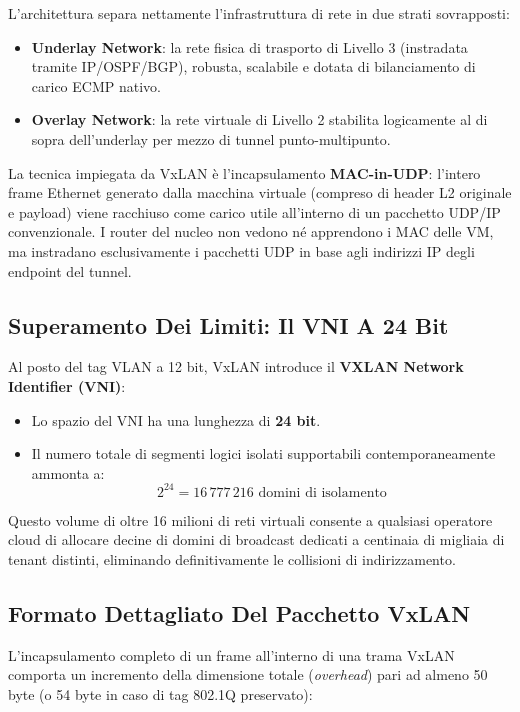 \documentclass[11pt, a4paper]{article}
\begin{document}
L'architettura separa nettamente l'infrastruttura di rete in due strati sovrapposti:
\begin{itemize}[noitemsep]
    \item \textbf{Underlay Network}: la rete fisica di trasporto di Livello 3 (instradata tramite IP/OSPF/BGP), robusta, scalabile e dotata di bilanciamento di carico ECMP nativo.
    \item \textbf{Overlay Network}: la rete virtuale di Livello 2 stabilita logicamente al di sopra dell'underlay per mezzo di tunnel punto-multipunto.
\end{itemize}


La tecnica impiegata da VxLAN è l'incapsulamento \textbf{MAC-in-UDP}: l'intero frame Ethernet generato dalla macchina virtuale (compreso di header L2 originale e payload) viene racchiuso come carico utile all'interno di un pacchetto UDP/IP convenzionale. I router del nucleo non vedono né apprendono i MAC delle VM, ma instradano esclusivamente i pacchetti UDP in base agli indirizzi IP degli endpoint del tunnel.


\subsection{Superamento Dei Limiti: Il VNI A 24 Bit}
Al posto del tag VLAN a 12 bit, VxLAN introduce il \textbf{VXLAN Network Identifier (VNI)}:
\begin{itemize}[noitemsep]
    \item Lo spazio del VNI ha una lunghezza di \textbf{24 bit}.
    \item Il numero totale di segmenti logici isolati supportabili contemporaneamente ammonta a:
    \[
    \boxed{2^{24} = 16\,777\,216 \text{ domini di isolamento}}
    \]
\end{itemize}
Questo volume di oltre 16 milioni di reti virtuali consente a qualsiasi operatore cloud di allocare decine di domini di broadcast dedicati a centinaia di migliaia di tenant distinti, eliminando definitivamente le collisioni di indirizzamento.

\subsection{Formato Dettagliato Del Pacchetto VxLAN}
L'incapsulamento completo di un frame all'interno di una trama VxLAN comporta un incremento della dimensione totale (\emph{overhead}) pari ad almeno 50 byte (o 54 byte in caso di tag 802.1Q preservato):
\end{document}
